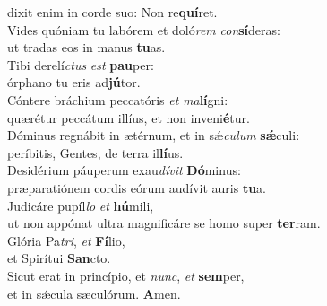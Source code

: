 \evenverse dixit enim in corde suo: Non re\textbf{quí}ret.\\
\oddverse Vides quóniam tu labórem et doló\textit{rem} \textit{con}\textbf{sí}deras:~\*\\
\oddverse ut tradas eos in manus \textbf{tu}as.\\
\evenverse Tibi derelí\textit{ctus} \textit{est} \textbf{pau}per:~\*\\
\evenverse órphano tu eris ad\textbf{jú}tor.\\
\oddverse Cóntere bráchium peccatóris \textit{et} \textit{ma}\textbf{lí}gni:~\*\\
\oddverse quærétur peccátum illíus, et non inveni\textbf{é}tur.\\
\evenverse Dóminus regnábit in ætérnum, et in sǽ\textit{cu}\textit{lum} \textbf{sǽ}culi:~\*\\
\evenverse períbitis, Gentes, de terra il\textbf{lí}us.\\
\oddverse Desidérium páuperum exau\textit{dí}\textit{vit} \textbf{Dó}minus:~\*\\
\oddverse præparatiónem cordis eórum audívit auris \textbf{tu}a.\\
\evenverse Judicáre pupíl\textit{lo} \textit{et} \textbf{hú}mili,~\*\\
\evenverse ut non appónat ultra magnificáre se homo super \textbf{ter}ram.\\
\oddverse Glória Pa\textit{tri}, \textit{et} \textbf{Fí}lio,~\*\\
\oddverse et Spirítui \textbf{San}cto.\\
\evenverse Sicut erat in princípio, et \textit{nunc}, \textit{et} \textbf{sem}per,~\*\\
\evenverse et in sǽcula sæculórum. \textbf{A}men.\\

